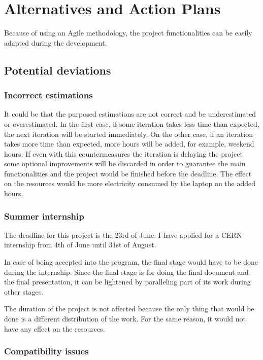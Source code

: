 \section{Alternatives and Action Plans}
Because of using an Agile methodology, the project functionalities can be easily adapted during the development. \\

\subsection{Potential deviations}
\subsubsection{Incorrect estimations}
It could be that the purposed estimations are not correct and be underestimated or overestimated. In the first case, if some iteration takes less time than expected, the next iteration will be started immediately. On the other case, if an iteration takes more time than expected, more hours will be added, for example, weekend hours. If even with this countermeasures the iteration is delaying the project some optional improvements will be discarded in order to guarantee the main functionalities and the project would be finished before the deadline. 
The effect on the resources would be more electricity consumed by the laptop on the added hours. 

\subsubsection{Summer internship}

The deadline for this project is the 23rd of June. 
I have applied for a CERN internship from 4th of June until 31st of August. 

In case of being accepted into the program, the final stage would have to be done during the internship. Since the final stage is for doing the final document and the final presentation, it can be lightened by paralleling part of its work during other stages.

The duration of the project is not affected because the only thing that would be done is a different distribution of the work. For the same reason, it would not have any effect on the resources.

\subsubsection{Compatibility issues}

